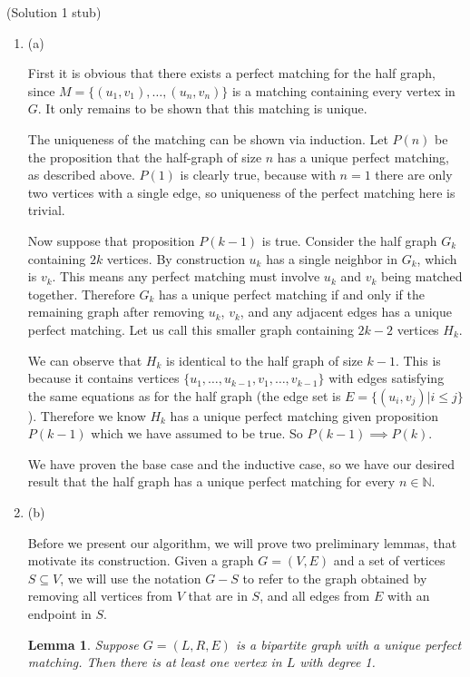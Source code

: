 \documentclass{hmcpset}
\newtheorem{lemma}{Lemma}
\begin{document}
\begin{solution}
(Solution 1 stub)
\begin{enumerate}
\item (a)

First it is obvious that there exists a perfect matching for the half graph, since
$M = \{(u_1,v_1),\ldots,(u_n,v_n)\}$ is a matching containing every vertex in $G$.
It only remains to be shown that this matching is unique.

The uniqueness of the matching can be shown via induction. Let $P(n)$ be the
proposition that the half-graph of size $n$ has a unique perfect matching,
as described above. $P(1)$ is clearly true, because with $n = 1$ there are only
two vertices with a single edge, so uniqueness of the perfect matching here
is trivial.

Now suppose that proposition $P(k - 1)$ is true. Consider the half graph $G_k$
containing $2k$ vertices. By construction $u_k$ has a single neighbor in $G_k$,
which is $v_k$. This means any perfect matching must involve $u_k$ and $v_k$
being matched together. Therefore $G_k$ has a unique perfect matching if and
only if the remaining graph after removing $u_k$, $v_k$, and any adjacent edges
has a unique perfect matching. Let us call this smaller graph containing
$2k -2$ vertices $H_k$.

We can observe that $H_k$ is identical to the half graph of size $k - 1$. This
is because it contains vertices $\{u_1,\ldots,u_{k-1},v_1,\ldots,v_{k-1}\}$ with
edges satisfying the same equations as for the half graph (the edge set is
$E = \{(u_i, v_j) | i \leq j\}$). Therefore we know $H_k$ has a unique perfect
matching given proposition $P(k - 1)$ which we have assumed to be true.
So $P(k - 1) \implies P(k)$.

We have proven the base case and the inductive case, so we have our desired
result that the half graph has a unique perfect matching for every $n \in \mathbb{N}$.


\item (b)

Before we present our algorithm, we will prove two preliminary lemmas, that motivate
its construction. Given a graph $G = (V, E)$ and a set of vertices $S \subseteq V$,
we will use the notation $G - S$ to refer to the graph obtained by removing all
vertices from $V$ that are in $S$, and all edges from $E$ with an endpoint in $S$.

\begin{lemma}
  Suppose $G = (L, R, E)$ is a bipartite graph with a unique perfect matching. Then
  there is at least one vertex in $L$ with degree 1.
\end{lemma}


\end{enumerate}
\end{solution}
\end{document}
